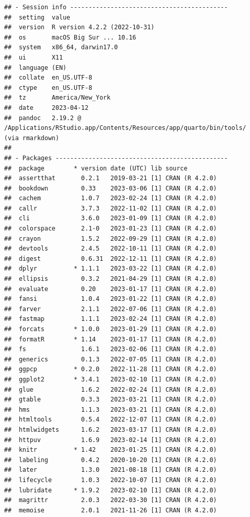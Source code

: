 \documentclass[print]{nuthesis}
\begin{document}
\begin{verbatim}
## - Session info -------------------------------------------
##  setting  value
##  version  R version 4.2.2 (2022-10-31)
##  os       macOS Big Sur ... 10.16
##  system   x86_64, darwin17.0
##  ui       X11
##  language (EN)
##  collate  en_US.UTF-8
##  ctype    en_US.UTF-8
##  tz       America/New_York
##  date     2023-04-12
##  pandoc   2.19.2 @ /Applications/RStudio.app/Contents/Resources/app/quarto/bin/tools/ (via rmarkdown)
## 
## - Packages -----------------------------------------------
##  package        * version date (UTC) lib source
##  assertthat       0.2.1   2019-03-21 [1] CRAN (R 4.2.0)
##  bookdown         0.33    2023-03-06 [1] CRAN (R 4.2.0)
##  cachem           1.0.7   2023-02-24 [1] CRAN (R 4.2.0)
##  callr            3.7.3   2022-11-02 [1] CRAN (R 4.2.0)
##  cli              3.6.0   2023-01-09 [1] CRAN (R 4.2.0)
##  colorspace       2.1-0   2023-01-23 [1] CRAN (R 4.2.0)
##  crayon           1.5.2   2022-09-29 [1] CRAN (R 4.2.0)
##  devtools         2.4.5   2022-10-11 [1] CRAN (R 4.2.0)
##  digest           0.6.31  2022-12-11 [1] CRAN (R 4.2.0)
##  dplyr          * 1.1.1   2023-03-22 [1] CRAN (R 4.2.0)
##  ellipsis         0.3.2   2021-04-29 [1] CRAN (R 4.2.0)
##  evaluate         0.20    2023-01-17 [1] CRAN (R 4.2.0)
##  fansi            1.0.4   2023-01-22 [1] CRAN (R 4.2.0)
##  farver           2.1.1   2022-07-06 [1] CRAN (R 4.2.0)
##  fastmap          1.1.1   2023-02-24 [1] CRAN (R 4.2.0)
##  forcats        * 1.0.0   2023-01-29 [1] CRAN (R 4.2.0)
##  formatR        * 1.14    2023-01-17 [1] CRAN (R 4.2.0)
##  fs               1.6.1   2023-02-06 [1] CRAN (R 4.2.0)
##  generics         0.1.3   2022-07-05 [1] CRAN (R 4.2.0)
##  ggpcp          * 0.2.0   2022-11-28 [1] CRAN (R 4.2.0)
##  ggplot2        * 3.4.1   2023-02-10 [1] CRAN (R 4.2.0)
##  glue             1.6.2   2022-02-24 [1] CRAN (R 4.2.0)
##  gtable           0.3.3   2023-03-21 [1] CRAN (R 4.2.0)
##  hms              1.1.3   2023-03-21 [1] CRAN (R 4.2.0)
##  htmltools        0.5.4   2022-12-07 [1] CRAN (R 4.2.0)
##  htmlwidgets      1.6.2   2023-03-17 [1] CRAN (R 4.2.0)
##  httpuv           1.6.9   2023-02-14 [1] CRAN (R 4.2.0)
##  knitr          * 1.42    2023-01-25 [1] CRAN (R 4.2.0)
##  labeling         0.4.2   2020-10-20 [1] CRAN (R 4.2.0)
##  later            1.3.0   2021-08-18 [1] CRAN (R 4.2.0)
##  lifecycle        1.0.3   2022-10-07 [1] CRAN (R 4.2.0)
##  lubridate      * 1.9.2   2023-02-10 [1] CRAN (R 4.2.0)
##  magrittr         2.0.3   2022-03-30 [1] CRAN (R 4.2.0)
##  memoise          2.0.1   2021-11-26 [1] CRAN (R 4.2.0)

\end{verbatim}
\end{document}
